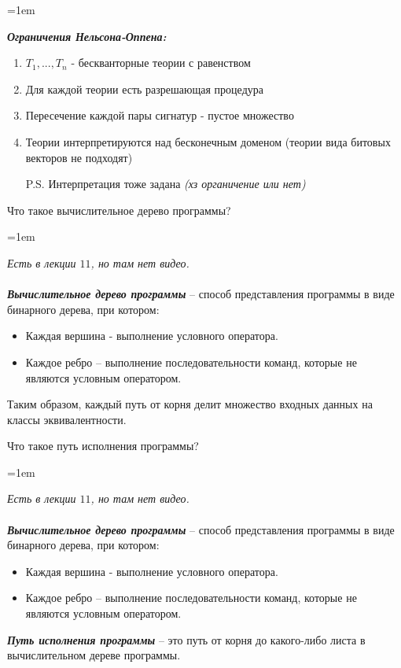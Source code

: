 \documentclass[12pt]{extreport}
\theoremstyle{definiton}
\theoremstyle{definition}
\theoremstyle{definition}
\newcommand{\solution}[2][\color{myblue}Ответ]{
\medskip
	\noindent{\bfseries #1 }{{\color{myblue}\bfseries #2:}}
}
\newenvironment{blockquote}{%
  \par%
  \medskip
  \leftskip=1em%
  \noindent}{%
  \par\medskip}
\begin{document}
\solution{19}
\begin{blockquote}
{\color{myblue}
\textbf{\textit{Ограничения Нельсона-Оппена:}}
\begin{enumerate}
    \item $T_1, ..., T_n$ - бескванторные теории с равенством
    \item Для каждой теории есть разрешающая процедура
    \item Пересечение каждой пары сигнатур - пустое множество
    \item Теории интерпретируются над бесконечным доменом (теории вида битовых векторов не подходят)
    \item[P.S.] Интерпретация тоже задана \textit{(хз органичение или нет)}
\end{enumerate}
}
\end{blockquote}

\Pr[\textcolor{mygreen}{Саит, DONE}] Что такое вычислительное дерево программы?
			
\solution{20}
\begin{blockquote}
{\color{myblue}
\textcolor{mypurpur}{\textit{Есть в лекции $11$, но там нет видео.}}\\
\\
\noindent \textbf{\textit{Вычислительное дерево программы}} -- способ представления программы в виде бинарного дерева, при котором:
\begin{itemize}
    \item Каждая вершина - выполнение условного оператора.
    \item Каждое ребро -- выполнение последовательности команд, которые не являются условным оператором.
\end{itemize}
Таким образом, каждый путь от корня делит множество входных данных на классы эквивалентности.
}
\end{blockquote}

\Pr[\textcolor{mygreen}{Алтана, DONE}] Что такое путь исполнения программы?
			
\solution{21}
\begin{blockquote}
{\color{myblue}
\textcolor{mypurpur}{\textit{Есть в лекции $11$, но там нет видео.}}\\
\\
\noindent \textbf{\textit{Вычислительное дерево программы}} -- способ представления программы в виде бинарного дерева, при котором:
\begin{itemize}
    \item Каждая вершина - выполнение условного оператора.
    \item Каждое ребро -- выполнение последовательности команд, которые не являются условным оператором.
\end{itemize}

\noindent \textbf{\textit{Путь исполнения программы}} -- это путь от корня до какого-либо листа в  вычислительном дереве программы.
}
\end{blockquote}
\end{document}
